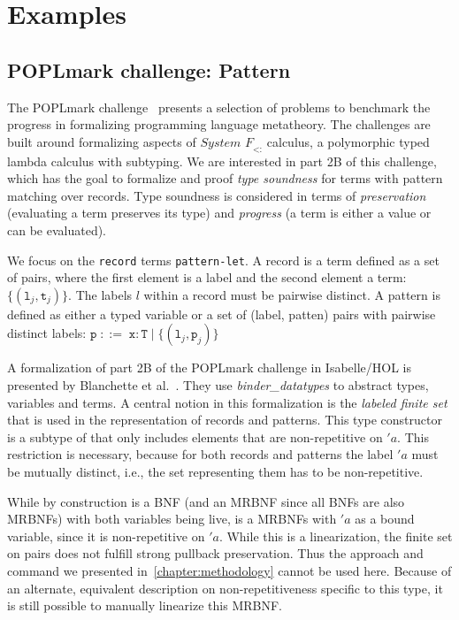
\chapter{Examples}
\label{chapter:examples}

  \section{POPLmark challenge: Pattern}
    The POPLmark challenge~\cite{aydemir2005mechanized} presents a selection of problems to benchmark the progress in formalizing programming language metatheory. The challenges are built around formalizing aspects of $\textit{System F}_\textit{<:}$ calculus, a polymorphic typed lambda calculus with subtyping. We are interested in part 2B of this challenge, which has the goal to formalize and proof \textit{type soundness} for terms with pattern matching over records. Type soundness is considered in terms of \textit{preservation} (evaluating a term preserves its type) and \textit{progress} (a term is either a value or can be evaluated).

    We focus on the \texttt{record} terms \texttt{pattern-let}. %
    A record is a term defined as a set of pairs, where the first element is a label and the second element a term: $\{(\texttt{l}_j, \texttt{t}_j)\}$. The labels $l$ within a record must be pairwise distinct.
    A pattern is defined as either a typed variable or a set of (label, patten) pairs with pairwise distinct labels:
    $\texttt{p}\; ::=\; \texttt{x}:\texttt{T}\; |\; \{(\texttt{l}_j, \texttt{p}_j)\}$

    A formalization of part 2B of the POPLmark challenge in Isabelle/HOL is presented by Blanchette et al.~\cite{blanchette2019bindings}. They use \textit{binder\_datatypes} to abstract types, variables and terms. A central notion in this formalization is the \textit{labeled finite set}  that is used in the representation of records and patterns. This type constructor is a subtype of  that only includes elements that are non-repetitive on $'a$. This restriction is necessary, because for both records and patterns the label $'a$ must be mutually distinct, i.e., the set representing them has to be non-repetitive.

    While by construction  is a \ac{BNF} (and an \ac{MRBNF} since all \acp{BNF} are also \acp{MRBNF}) with both variables being live,  is a \acp{MRBNF} with $'a$ as a bound variable, since it is non-repetitive on $'a$.
    While this is a linearization, the finite set on pairs does not fulfill strong pullback preservation. Thus the approach and command we presented in~\autoref{chapter:methodology} cannot be used here. Because of an alternate, equivalent description on non-repetitiveness specific to this type, it is still possible to manually linearize this \ac{MRBNF}.

